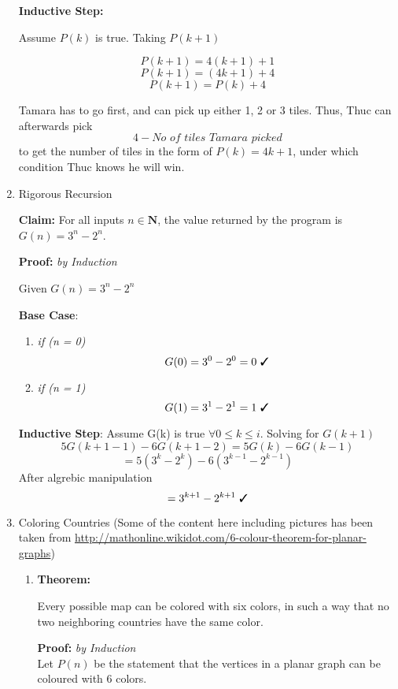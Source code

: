 \documentclass[11pt]{article}
\newcommand{\cmark}{\ding{51}}%
\begin{document}
\begin{enumerate}
		\textbf{Inductive Step:}
		
		Assume $P(k)$ is true. Taking $P(k+1)$
		
		$$P(k+1) = 4(k+1) + 1$$  
		$$P(k+1) = (4k + 1) + 4$$ 
		$$P(k+1) = P(k) + 4$$
		
		Tamara has to go first, and can pick up either 1, 2 or 3 tiles. Thus, Thuc can afterwards pick 
		$$4 - \textit{No of tiles Tamara picked}$$ to get the number of tiles in the form of $P(k) = 4k + 1$, under which condition Thuc knows he will win. \cmark
		
		
		\newpage
		\item Rigorous Recursion
		
		\textbf{Claim:} For all inputs $n\in\mathbf{N}$, the value returned by the program is $G(n)=3^n-2^n$.
		
		\textbf{Proof:} \textit{by Induction}
		
		Given $G(n) = 3^n - 2^n$
		
		\textbf{Base Case}:
			\begin{enumerate}
				\item \textit{if (n = 0)}
					$$G(0) = 3^0 - 2^0 = 0 \text{ \cmark}$$  
				\item \textit{if (n = 1)}
					$$G(1) = 3^1 - 2^1 = 1 \text{ \cmark}$$ 
			
			\end{enumerate}
			
		
			\textbf{Inductive Step}:
			Assume G(k) is true $\forall 0 \le k \le i$. Solving for $G(k+1)$ 
					$$5G(k + 1 - 1) - 6G(k + 1 - 2) = 5G(k) - 6G(k - 1)$$
					$$= 5(3^{k} - 2^{k}) - 6(3^{k-1} - 2^{k-1})$$ 
					After algrebic manipulation
					$$ = 3^{k+1} - 2^{k+1} \text{ \cmark } $$
					
			
		
		
		
		\newpage
		\item Coloring Countries (Some of the content here including pictures has been taken from \url{http://mathonline.wikidot.com/6-colour-theorem-for-planar-graphs})
		
		\begin{enumerate}
			
			\item
			\textbf{Theorem:}
			
			Every possible map can be colored with six colors, in such a way that no
			two neighboring countries have the same color.
			
			\textbf{Proof:} \textit{by Induction} \\
			Let $P(n)$ be the statement that the vertices in a planar graph can be coloured with 6 colors. 
			

\end{enumerate}
\end{enumerate}
\end{document}
